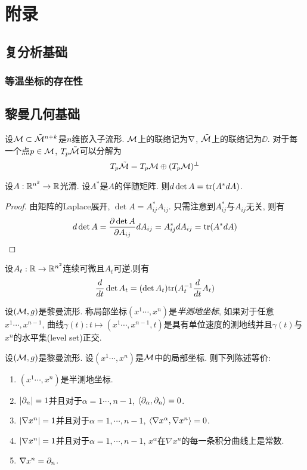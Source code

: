 \appendix
\appendix
\chapter{附录}
\section{复分析基础}
\subsection{等温坐标的存在性}
\section{黎曼几何基础}
设$\M\subset \MM^{n+k}$是$n$维嵌入子流形. $\M$上的联络记为$\D$, $\MM$上的联络记为$\DD$. 对于每一个点$p \in \M$, $T_p\MM$可以分解为
\begin{equation}
    T_p\MM=T_p\M \oplus  (T_p\M)^\T
\end{equation}
\begin{lemma}
    设$A: \R^{n^2} \to \R$光滑. 设$A^*$是$A$的伴随矩阵. 则$d\det A=\tr(A^*dA)$.
\end{lemma}
\begin{proof}
    由矩阵的Laplace展开, $\det A=A^*_{ij}A_{ij}$. 只需注意到$A^*_{ij}$与$A_{ij}$无关, 则有
    \begin{equation}
        d\det A= \frac{\P \det A}{\P A_{ij}}dA_{ij}=A^*_{ij}dA_{ij}=\tr(A^*dA)
    \end{equation}
\end{proof}
\begin{corollary}
    设$A_t: \R \to \R^{n^2}$连续可微且$A_t$可逆.则有
    \begin{equation}
        \frac{d}{dt}\det A_t=(\det A_t)\tr(A^{-1}_t\frac{d}{dt}A_t)
    \end{equation}
\end{corollary}
\begin{definition}
    设$(\M,g)$是黎曼流形.  称局部坐标$(x^1\cdots, x^n)$是\textit{半测地坐标}, 如果对于任意$x^1\cdots, x^{n-1}$, 曲线$\gamma(t): t \mapsto (x^1\cdots,x^{n-1},t)$是具有单位速度的测地线并且$\gamma(t)$与$x^n$的水平集(level set)正交.
\end{definition}
\begin{lemma}
    设$(\M,g)$是黎曼流形.  设$(x^1\cdots, x^n)$是$\M$中的局部坐标. 则下列陈述等价:
    \begin{enumerate}
        \item $(x^1\cdots, x^n)$是半测地坐标.
        \item $\abs{\P_n}=1$并且对于$\alpha=1\cdots,n-1$, $\inner{\P_\alpha}{\P_n}=0$.
        \item $\abs{\nabla x^n}=1$并且对于$\alpha=1,\cdots,n-1$, $\inner{\nabla x^\alpha}{\nabla x^n}=0$.
        \item $\abs{\nabla x^n}=1$并且对于$\alpha=1,\cdots,n-1$, $x^\alpha$在$\nabla x^n$的每一条积分曲线上是常数.
        \item $\nabla x^n=\P_n$.
    \end{enumerate}
\end{lemma}


